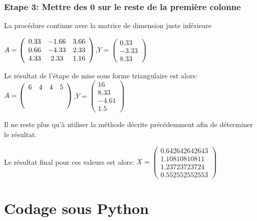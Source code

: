 \begin{frame}[fragile]
\frametitle{Etape 3: Mettre des 0 sur le reste de la première colonne}

La procédure continue avec la matrice de dimension juste inférieure

$A=\left(\begin{array}{c c c}
0.33 & -1.66 & 3.66 \\
0.66 & -4.33 & 2.33 \\
4.33 & 2.33 & 1.16
\end{array}\right)$,$Y=\left(\begin{array}{c}
0.33 \\
-3.33 \\
8.33
\end{array}\right)$

Le résultat de l'étape de mise sous forme triangulaire est alors:
$A=\left(\begin{array}{c c c c}
6 & 4 & 4 & 5 \\
\ifdef{\public}{\uncover<2->{0 & 4.33 & 2.33 & 1.16\\}}{ \\}
\ifdef{\public}{\uncover<2->{0 & 0 & -4.69 & 2.15\\}}{ \\}
\ifdef{\public}{\uncover<2->{0 & 0 & 0 & 2.73}}{}
\end{array}\right)$,$Y=\left(\begin{array}{c}
16 \\
8.33 \\
-4.61 \\
1.5
\end{array}\right)$

\end{frame}


\begin{frame}[fragile]

Il ne reste plus qu'à utiliser la méthode décrite précédemment afin de déterminer le résultat.

Le résultat final pour ces valeurs est alors: $X=\left(\begin{array}{c}
0.642642642643 \\ 1.10810810811 \\ 1.23723723724 \\ 0.552552552553\end{array}\right)$

\end{frame}

\section{Codage sous Python}

